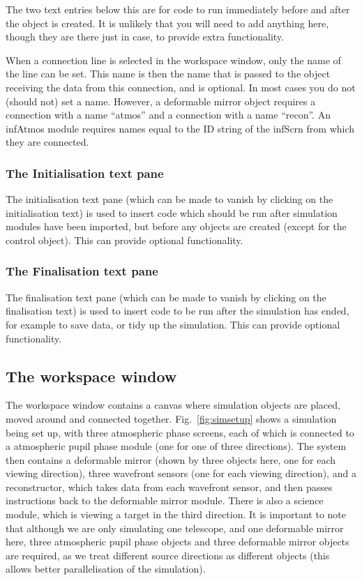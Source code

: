 \documentclass{article}
\begin{document}
The two text entries below this are for code to run immediately before
and after the object is created.  It is unlikely that you will need to
add anything here, though they are there just in case, to provide
extra functionality.  

When a connection line is selected in the workspace window, only the
name of the line can be set.  This name is then the name that is
passed to the object receiving the data from this connection, and is
optional.  In most cases you do not (should not) set a name.  However,
a deformable mirror object requires a connection with a name ``atmos''
and a connection with a name ``recon''.  An infAtmos module requires
names equal to the ID string of the infScrn from which they are
connected.  

\subsubsection{The Initialisation text pane}
The initialisation text pane (which can be made to vanish by clicking
on the initialisation text) is used to insert code which should be run
after simulation modules have been imported, but before any objects
are created (except for the control object).  This can provide
optional functionality.

\subsubsection{The Finalisation text pane}
The finalisation text pane (which can be made to vanish by clicking on
the finalisation text) is used to insert code to be run after the
simulation has ended, for example to save data, or tidy up the
simulation.  This can provide optional functionality.

\subsection{The workspace window}
The workspace window contains a canvas where simulation objects are
placed, moved around and connected together.  Fig.~\ref{fig:simsetup}
shows a simulation being set up, with three atmospheric phase screens,
each of which is connected to a atmospheric pupil phase module (one
for one of three directions).  The system then contains a deformable
mirror (shown by three objects here, one for each viewing direction),
three wavefront sensors (one for each viewing direction), and a
reconstructor, which takes data from each wavefront sensor, and then
passes instructions back to the deformable mirror module.  There is
also a science module, which is viewing a target in the third
direction.  It is important to note that although we are only
simulating one telescope, and one deformable mirror here, three
atmospheric pupil phase objects and three deformable mirror objects
are required, as we treat different source directions as different
objects (this allows better parallelisation of the simulation).
\end{document}
